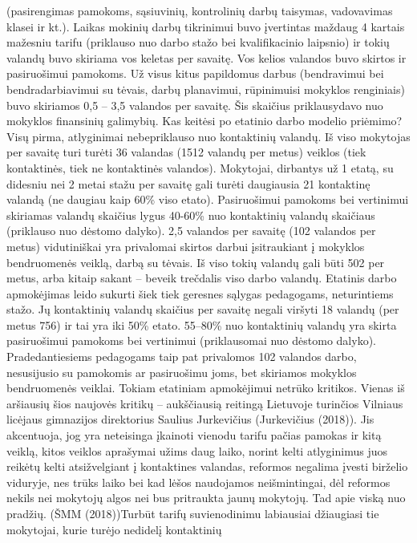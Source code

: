 \documentclass[]{article}
\begin{document}
(pasirengimas pamokoms, sąsiuvinių, kontrolinių darbų taisymas,
vadovavimas klasei ir kt.). Laikas mokinių darbų tikrinimui buvo
įvertintas maždaug 4 kartais mažesniu tarifu (priklauso nuo darbo stažo
bei kvalifikacinio laipsnio) ir tokių valandų buvo skiriama vos keletas
per savaitę. Vos kelios valandos buvo skirtos ir pasiruošimui pamokoms.
Už visus kitus papildomus darbus (bendravimui bei bendradarbiavimui su
tėvais, darbų planavimui, rūpinimuisi mokyklos renginiais) buvo
skiriamos 0,5 -- 3,5 valandos per savaitę. Šis skaičius priklausydavo
nuo mokyklos finansinių galimybių. Kas keitėsi po etatinio darbo modelio
priėmimo? Visų pirma, atlyginimai nebepriklauso nuo kontaktinių valandų.
Iš viso mokytojas per savaitę turi turėti 36 valandas (1512 valandų per
metus) veiklos (tiek kontaktinės, tiek ne kontaktinės valandos).
Mokytojai, dirbantys už 1 etatą, su didesniu nei 2 metai stažu per
savaitę gali turėti daugiausia 21 kontaktinę valandą (ne daugiau kaip
60\% viso etato). Pasiruošimui pamokoms bei vertinimui skiriamas valandų
skaičius lygus 40-60\% nuo kontaktinių valandų skaičiaus (priklauso nuo
dėstomo dalyko). 2,5 valandos per savaitę (102 valandos per metus)
vidutiniškai yra privalomai skirtos darbui įsitraukiant į mokyklos
bendruomenės veiklą, darbą su tėvais. Iš viso tokių valandų gali būti
502 per metus, arba kitaip sakant -- beveik trečdalis viso darbo
valandų. Etatinis darbo apmokėjimas leido sukurti šiek tiek geresnes
sąlygas pedagogams, neturintiems stažo. Jų kontaktinių valandų skaičius
per savaitę negali viršyti 18 valandų (per metus 756) ir tai yra iki
50\% etato. 55--80\% nuo kontaktinių valandų yra skirta pasiruošimui
pamokoms bei vertinimui (priklausomai nuo dėstomo dalyko).
Pradedantiesiems pedagogams taip pat privalomos 102 valandos darbo,
nesusijusio su pamokomis ar pasiruošimu joms, bet skiriamos mokyklos
bendruomenės veiklai. Tokiam etatiniam apmokėjimui netrūko kritikos.
Vienas iš aršiausių šios naujovės kritikų -- aukščiausią reitingą
Lietuvoje turinčios Vilniaus licėjaus gimnazijos direktorius Saulius
Jurkevičius (Jurkevičius (2018)). Jis akcentuoja, jog yra neteisinga
įkainoti vienodu tarifu pačias pamokas ir kitą veiklą, kitos veiklos
aprašymai užims daug laiko, norint kelti atlyginimus juos reikėtų kelti
atsižvelgiant į kontaktines valandas, reformos negalima įvesti birželio
viduryje, nes trūks laiko bei kad lėšos naudojamos neišmintingai, dėl
reformos nekils nei mokytojų algos nei bus pritraukta jaunų mokytojų.
Tad apie viską nuo pradžių. (ŠMM (2018))Turbūt tarifų suvienodinimu
labiausiai džiaugiasi tie mokytojai, kurie turėjo nedidelį kontaktinių
\end{document}
